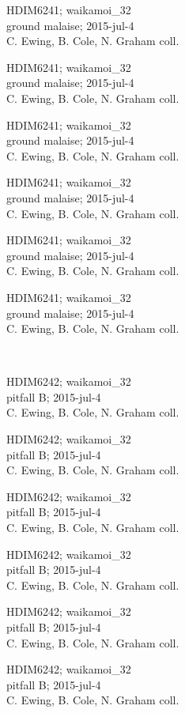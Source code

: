\documentclass[2pt]{extarticle}
\begin{document}
\noindent
\parbox{0.16\textwidth}{\tiny \raggedright \rule[-0.3\baselineskip]{0pt}{10pt}HDIM6241; waikamoi\_32\\ ground malaise; 2015-jul-4\\ C. Ewing, B. Cole, N. Graham coll.}
\parbox{0.16\textwidth}{\tiny \raggedright \rule[-0.3\baselineskip]{0pt}{10pt}HDIM6241; waikamoi\_32\\ ground malaise; 2015-jul-4\\ C. Ewing, B. Cole, N. Graham coll.}
\parbox{0.16\textwidth}{\tiny \raggedright \rule[-0.3\baselineskip]{0pt}{10pt}HDIM6241; waikamoi\_32\\ ground malaise; 2015-jul-4\\ C. Ewing, B. Cole, N. Graham coll.}
\parbox{0.16\textwidth}{\tiny \raggedright \rule[-0.3\baselineskip]{0pt}{10pt}HDIM6241; waikamoi\_32\\ ground malaise; 2015-jul-4\\ C. Ewing, B. Cole, N. Graham coll.}
\parbox{0.16\textwidth}{\tiny \raggedright \rule[-0.3\baselineskip]{0pt}{10pt}HDIM6241; waikamoi\_32\\ ground malaise; 2015-jul-4\\ C. Ewing, B. Cole, N. Graham coll.}
\parbox{0.16\textwidth}{\tiny \raggedright \rule[-0.3\baselineskip]{0pt}{10pt}HDIM6241; waikamoi\_32\\ ground malaise; 2015-jul-4\\ C. Ewing, B. Cole, N. Graham coll.} \\ 
\vspace{0.001in} 

\noindent
\parbox{0.16\textwidth}{\tiny \raggedright \rule[-0.3\baselineskip]{0pt}{10pt}HDIM6242; waikamoi\_32\\ pitfall B; 2015-jul-4\\ C. Ewing, B. Cole, N. Graham coll.}
\parbox{0.16\textwidth}{\tiny \raggedright \rule[-0.3\baselineskip]{0pt}{10pt}HDIM6242; waikamoi\_32\\ pitfall B; 2015-jul-4\\ C. Ewing, B. Cole, N. Graham coll.}
\parbox{0.16\textwidth}{\tiny \raggedright \rule[-0.3\baselineskip]{0pt}{10pt}HDIM6242; waikamoi\_32\\ pitfall B; 2015-jul-4\\ C. Ewing, B. Cole, N. Graham coll.}
\parbox{0.16\textwidth}{\tiny \raggedright \rule[-0.3\baselineskip]{0pt}{10pt}HDIM6242; waikamoi\_32\\ pitfall B; 2015-jul-4\\ C. Ewing, B. Cole, N. Graham coll.}
\parbox{0.16\textwidth}{\tiny \raggedright \rule[-0.3\baselineskip]{0pt}{10pt}HDIM6242; waikamoi\_32\\ pitfall B; 2015-jul-4\\ C. Ewing, B. Cole, N. Graham coll.}
\parbox{0.16\textwidth}{\tiny \raggedright \rule[-0.3\baselineskip]{0pt}{10pt}HDIM6242; waikamoi\_32\\ pitfall B; 2015-jul-4\\ C. Ewing, B. Cole, N. Graham coll.} \\ 
\vspace{0.001in} 
\end{document}
